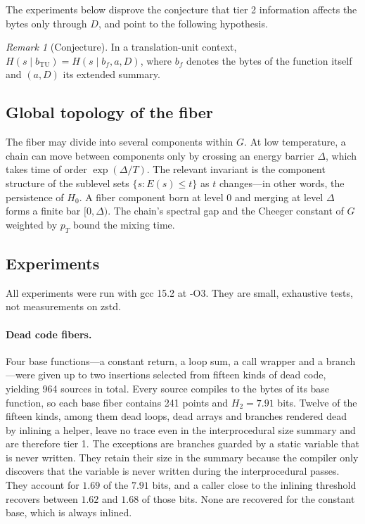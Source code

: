 \documentclass[11pt]{article}
\theoremstyle{definition}
\theoremstyle{remark}
\newtheorem{remark}[theorem]{Remark}
\begin{document}
The experiments below disprove the conjecture that tier 2 information affects the bytes only through $D$, and point to the following hypothesis.

\begin{remark}[Conjecture]
In a translation-unit context, $H(s \mid b_{\mathrm{TU}}) = H(s \mid b_f, a, D)$, where $b_f$ denotes the bytes of the function itself and $(a, D)$ its extended summary.
\end{remark}

\subsection{Global topology of the fiber}

The fiber may divide into several components within $G$. At low temperature, a chain can move between components only by crossing an energy barrier $\Delta$, which takes time of order $\exp(\Delta/T)$. The relevant invariant is the component structure of the sublevel sets $\{ s : E(s) \le t \}$ as $t$ changes—in other words, the persistence of $H_0$. A fiber component born at level $0$ and merging at level $\Delta$ forms a finite bar $[0, \Delta)$. The chain's spectral gap and the Cheeger constant of $G$ weighted by $p_T$ bound the mixing time.

\subsection{Experiments}

All experiments were run with gcc 15.2 at -O3. They are small, exhaustive tests, not measurements on zstd.

\paragraph{Dead code fibers.} Four base functions—a constant return, a loop sum, a call wrapper and a branch—were given up to two insertions selected from fifteen kinds of dead code, yielding 964 sources in total. Every source compiles to the bytes of its base function, so each base fiber contains 241 points and $H_2 = 7.91$ bits. Twelve of the fifteen kinds, among them dead loops, dead arrays and branches rendered dead by inlining a helper, leave no trace even in the interprocedural size summary and are therefore tier 1. The exceptions are branches guarded by a static variable that is never written. They retain their size in the summary because the compiler only discovers that the variable is never written during the interprocedural passes. They account for $1.69$ of the $7.91$ bits, and a caller close to the inlining threshold recovers between $1.62$ and $1.68$ of those bits. None are recovered for the constant base, which is always inlined.
\end{document}
